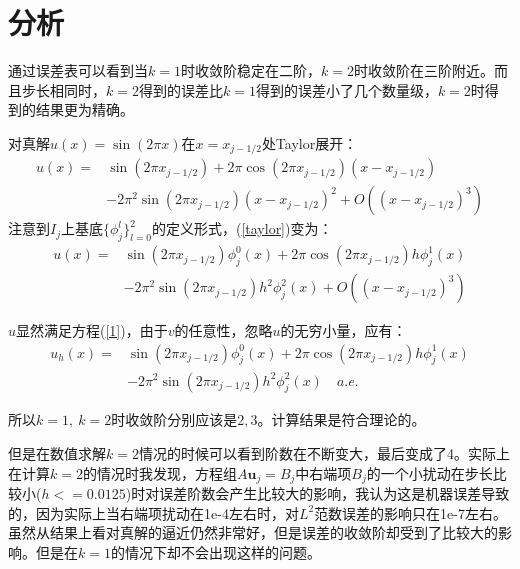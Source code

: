 \documentclass[12pt, a4paper]{ctexart}
\begin{document}
	\section{分析}
	
	通过误差表可以看到当$k=1$时收敛阶稳定在二阶，$k=2$时收敛阶在三阶附近。而且步长相同时，$k=2$得到的误差比$k=1$得到的误差小了几个数量级，$k=2$时得到的结果更为精确。
	
	对真解$u(x)= \sin(2\pi x)$在$x = x_{j-1/2}$处Taylor展开：
	\begin{equation}
	\begin{split}
	u(x) = & \sin(2\pi x_{j-1/2}) + 2\pi \cos(2\pi x_{j-1/2}) (x - x_{j-1/2})\\
	& - 2\pi^2 \sin(2\pi x_{j-1/2}) (x- x_{j-1/2})^2 + O((x- x_{j-1/2})^3)
	\end{split}
	\label{taylor}
	\end{equation}
	注意到$I_j$上基底$\{\phi_j^l\}_{l=0}^2$的定义形式，(\ref{taylor})变为：
	\begin{equation}
	\begin{split}
	u(x) = & \sin(2\pi x_{j-1/2}) \phi_j^0(x) + 2\pi \cos(2\pi x_{j-1/2}) h \phi_j^1(x)\\
	& - 2\pi^2 \sin(2\pi x_{j-1/2}) h^2 \phi_j^2(x) + O((x- x_{j-1/2})^3)
	\end{split}
	\end{equation}
	
	$u$显然满足方程(\ref{1})，由于$v$的任意性，忽略$u$的无穷小量，应有：
	\begin{equation*}
	\begin{split}
	u_h(x) = & \sin(2\pi x_{j-1/2}) \phi_j^0(x) + 2\pi \cos(2\pi x_{j-1/2}) h \phi_j^1(x)\\
	& - 2\pi^2 \sin(2\pi x_{j-1/2}) h^2 \phi_j^2(x) \quad a.e.
	\end{split}
	\end{equation*}
	
	所以$k=1, \  k=2$时收敛阶分别应该是$2, 3$。计算结果是符合理论的。
	
	但是在数值求解$k=2$情况的时候可以看到阶数在不断变大，最后变成了4。实际上在计算$k=2$的情况时我发现，方程组$A\textbf{u}_j =B_j$中右端项$B_j$的一个小扰动在步长比较小($h <= 0.0125$)时对误差阶数会产生比较大的影响，我认为这是机器误差导致的，因为实际上当右端项扰动在1e-4左右时，对$L^2$范数误差的影响只在1e-7左右。虽然从结果上看对真解的逼近仍然非常好，但是误差的收敛阶却受到了比较大的影响。但是在$k=1$的情况下却不会出现这样的问题。
	
	
\end{document}
